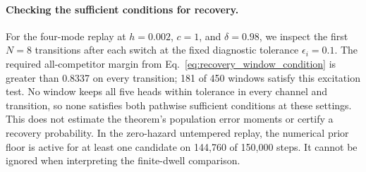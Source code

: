 \paragraph{Checking the sufficient conditions for recovery.}
For the four-mode replay at \(h=0.002\), \(c=1\), and \(\delta=0.98\), we inspect the first \(N=8\) transitions after each switch at the fixed diagnostic tolerance \(\epsilon_i=0.1\). The required all-competitor margin from Eq.~\eqref{eq:recovery_window_condition} is greater than 0.8337 on every transition; 181 of 450 windows satisfy this excitation test. No window keeps all five heads within tolerance in every channel and transition, so none satisfies both pathwise sufficient conditions at these settings. This does not estimate the theorem's population error moments or certify a recovery probability. In the zero-hazard untempered replay, the numerical prior floor is active for at least one candidate on 144,760 of 150,000 steps. It cannot be ignored when interpreting the finite-dwell comparison.
